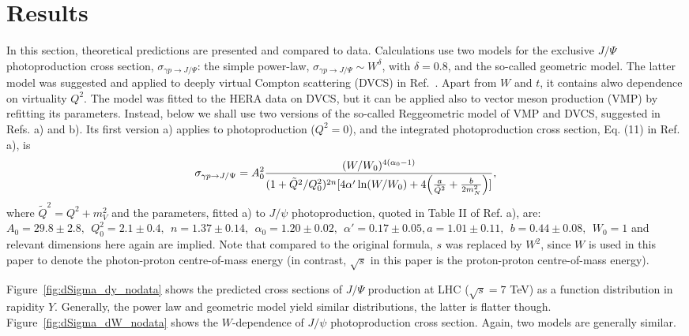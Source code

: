 \documentclass[12pt]{article}
\begin{document}
\section{Results}

In this section, theoretical predictions are presented and compared to data.
Calculations use two models for the exclusive $J/\Psi$ photoproduction cross section, $\sigma_{\gamma p \to J/\Psi}$:
the simple power-law, $\sigma_{\gamma p \to J/\Psi}\sim W^\delta$, with $\delta=0.8$, and the so-called geometric model.
The latter model was suggested and applied to deeply virtual Compton scattering (DVCS) in Ref.~\cite{Capua}.
Apart from $W$ and $t$, it contains alwo dependence on virtuality $Q^2$.
The model was fitted to the HERA data on DVCS, but it can be applied also to vector meson production (VMP) by refitting its parameters.
Instead, below we shall use two versions of the so-called Reggeometric model of VMP and DVCS, suggested in Refs. \cite{Fazio}a) and \cite{Fazio}b).
Its first version \cite{Fazio} a) applies to photoproduction ($Q^2=0$), and the integrated photoproduction cross section, Eq. (11) in Ref. \cite{Fazio}a), is
\begin{equation}
\sigma_{\gamma p \to J/\Psi}=A_0^2\frac{(W/W_0)^{4(\alpha_0-1)}}{(1+\tilde Q^2/Q^2_0)^{2n}[4\alpha'\ln(W/W_0)+4\Bigl(\frac{a}{\tilde Q^2}+\frac{b}{2m_N^2}\Bigr)]},
\end{equation}
where $\tilde Q^2=Q^2+m_V^2$ and the parameters, fitted \cite{Fazio}a) to $J/\psi$ photoproduction, quoted in
Table II of Ref. \cite{Fazio}a), are: $A_0=29.8\pm 2.8,\ \ Q_0^2=2.1\pm 0.4,\ \
n=1.37\pm 0.14,\ \ \alpha_0 =1.20\pm 0.02,\ \ \alpha'=0.17\pm 0.05, a=1.01\pm 0.11,\ \ b=0.44\pm 0.08,\ \ W_0=1$ and relevant dimensions here again are implied.
Note that compared to the original formula, $s$ was replaced by $W^2$, since $W$ is used in this paper to 
denote the photon-proton centre-of-mass energy (in contrast, $\sqrt{s}$ in this paper is the proton-proton centre-of-mass energy).

Figure~\ref{fig:dSigma_dy_nodata} shows the predicted cross sections of $J/\Psi$ production at LHC ($\sqrt{s}=7$ TeV) as a function distribution in rapidity $Y$.
Generally, the power law and geometric model yield similar distributions,  the latter is flatter though.
Figure~\ref{fig:dSigma_dW_nodata} shows the $W$-dependence of $J/\psi$ photoproduction cross section.
Again, two models are generally similar.
\newpage
\end{document}
